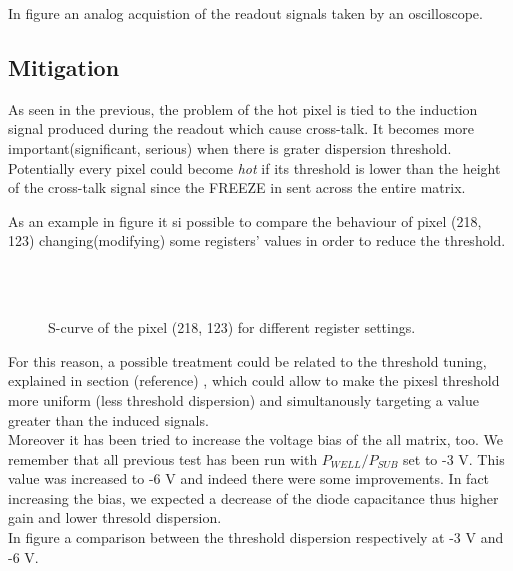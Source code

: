 In figure %
an analog acquistion of the readout signals taken by an oscilloscope.





\subsection{Mitigation}

As seen in the previous, the problem of the hot pixel is tied to the induction signal produced during the readout which cause cross-talk. It becomes more important(significant, serious) when there is grater dispersion threshold.\\

Potentially every pixel could become \textit{hot} if its threshold is lower than the height of the cross-talk signal since the \textsc{FREEZE} in sent across the entire matrix. 

As an example in figure  it si possible to compare the behaviour of pixel (218, 123) changing(modifying) some registers' values in order to reduce the threshold.

\begin{figure}[h!]
\centering
{}\quad
{}\\
\\
\caption{S-curve of the pixel (218, 123) for different register settings.}
\label{fig:making_hot}
\end{figure}

 
For this reason, a possible treatment could be related to the threshold tuning, explained in section (reference) , which could allow to make the pixesl threshold more uniform (less threshold dispersion) and simultanously targeting a value greater than the induced signals. \\


Moreover it has been tried to increase the voltage bias of the all matrix, too. We remember that all previous test has been run with $P_{WELL}/P_{SUB}$ set to -3 V. This value was increased to -6 V and indeed there were some improvements. In fact increasing the bias, we expected a decrease of the diode capacitance thus higher gain and lower thresold dispersion.\\
In figure %
a comparison between the threshold dispersion respectively at -3 V and -6 V.


